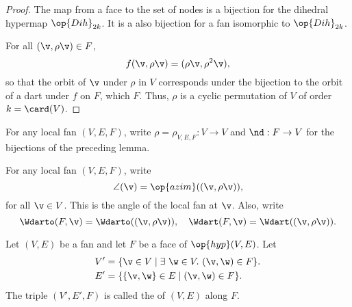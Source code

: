 


\begin{proof} The map from a face to the set of nodes is a bijection
  for the dihedral hypermap $\op{Dih}_{2k}$. It is a also bijection
  for a fan isomorphic to $\op{Dih}_{2k}$.

For all $(\v,\rho \v)\in F$,
\[ 
f(\v,\rho \v) = (\rho\v,\rho^2\v),
\] 
so that the orbit of $\v$ under $\rho$ in $V$ corresponds under the
bijection to the orbit of a dart under $f$ on $F$, which $F$.  Thus,
$\rho$ is a cyclic permutation of $V$ of order $k=\card(V)$.
\end{proof}

\begin{definition}[$\rho$,~$\nd$] 
For any  local fan $(V,E,F)$, write $\rho=\rho_{V,E,F}:V\to V$
and $\nd:F\to V$  for the bijections of the preceding
lemma.
\end{definition}
%
%


\begin{definition}
For any  local fan $(V,E,F)$,
write
\[ 
\angle(\v) = \op{azim}((\v,\rho\v)),
\] 
for all $\v\in V$.  This is the  angle of the
 local fan at $\v$.  Also, write
\[ 
  \Wdarto(F,\v) = \Wdarto((\v,\rho \v)),\quad 
\Wdart(F,\v) =\Wdart((\v,\rho \v)).
\] 
%
%
\end{definition}

\begin{definition}[localization]
 Let $(V,E)$ be a fan and let $F$ be
a face of $\op{hyp}(V,E)$.  Let
\begin{align*}
V' &= \{\v\in V \mid \exists~\w\in V.~(\v,\w)\in F\}.\\
E' &= \{\{\v,\w\} \in E\mid (\v,\w)\in F\}.
\end{align*}
The triple $(V',E',F)$ is called the  of $(V,E)$ along $F$.
\end{definition}
%


